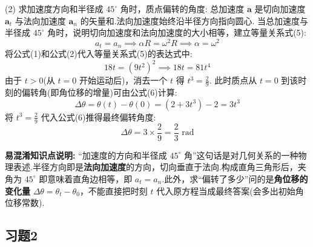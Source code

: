 \begin{enumerate}
(2) 求加速度方向和半径成 $45^\circ$ 角时，质点偏转的角度:
总加速度 $\mathbf{a}$ 是切向加速度 $\mathbf{a}_t$ 与法向加速度 $\mathbf{a}_n$ 的矢量和.法向加速度始终沿半径方向指向圆心.
当总加速度与半径成 $45^\circ$ 角时，说明切向加速度和法向加速度的大小相等，建立等量关系式(5):
\begin{equation}
	a_t = a_n \implies \alpha R = \omega^2 R \implies \alpha = \omega^2
\end{equation}
将公式(1)和公式(2)代入等量关系式(5)的表达式中:
$$ 18t = (9t^2)^2 \implies 18t = 81t^4 $$
由于 $t > 0$(从 $t=0$ 开始运动后)，消去一个 $t$ 得 $t^3 = \frac{2}{9}$.
此时质点从 $t=0$ 到该时刻的偏转角(即角位移的增量)可由公式(6)计算:
\begin{equation}
	\Delta\theta = \theta(t) - \theta(0) = (2 + 3t^3) - 2 = 3t^3
\end{equation}
将 $t^3 = \frac{2}{9}$ 代入公式(6)推得最终偏转角度:
$$ \Delta\theta = 3 \times \frac{2}{9} = \frac{2}{3} \text{ rad} $$

\textbf{易混淆知识点说明:}
“加速度的方向和半径成 $45^\circ$ 角”这句话是对几何关系的一种物理表述.半径方向即是\textbf{法向加速度}的方向，切向垂直于法向.构成直角三角形后，夹角为 $45^\circ$ 即意味着直角边相等，即 $a_t = a_n$.此外，求“偏转了多少”问的是\textbf{角位移的变化量} $\Delta\theta = \theta_t - \theta_0$，不能直接把时刻 $t$ 代入原方程当成最终答案(会多出初始角位移常数).


\end{enumerate}

\newpage

\subsection{习题2}

